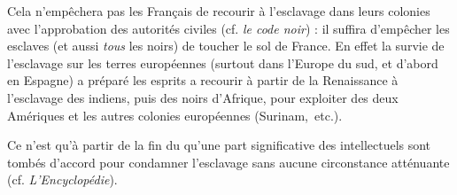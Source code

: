  Cela n'empêchera pas les Français de recourir à l'esclavage dans leurs colonies avec l'approbation des autorités civiles (cf. \emph{le code noir}) : il suffira d'empêcher les esclaves (et aussi \emph{tous} les noirs) de toucher le sol de France. En effet la survie de l'esclavage sur les terres européennes (surtout dans l'Europe du sud, et d'abord en Espagne) a préparé les esprits a recourir à partir de la Renaissance à l'esclavage des indiens, puis des noirs d'Afrique, pour exploiter des deux Amériques et les autres colonies européennes (Surinam,~etc.). 

 Ce n'est qu'à partir de la fin du  qu'une part significative des intellectuels sont tombés d'accord pour condamner l'esclavage sans aucune circonstance atténuante (cf. \emph{L'Encyclopédie}).
